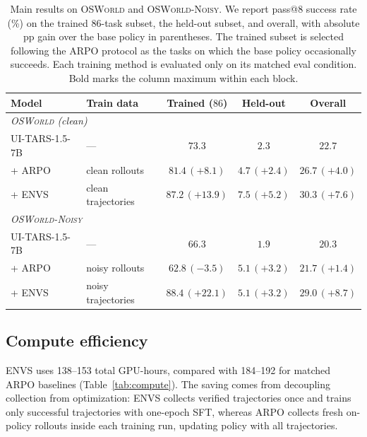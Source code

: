 \documentclass[11pt]{article}
\begin{document}
\begin{table}[H]
  \caption{Main results on \textsc{OSWorld} and \textsc{OSWorld-Noisy}. We
  report pass@8 success rate (\%) on the trained 86-task subset, the
  held-out subset, and overall, with absolute pp gain over the base
  policy in parentheses. The trained subset is selected following the
  ARPO protocol as the tasks on which the base policy occasionally
  succeeds. Each training method is evaluated only on its matched eval
  condition. Bold marks the column maximum within each block.}
  \label{tab:main-results}
  \centering
  \small
  \begin{tabular}{llccc}
    \toprule
    Model           & Train data         & Trained ($86$)            & Held-out                 & Overall                    \\
    \midrule
    \multicolumn{5}{l}{\textit{\textsc{OSWorld} (clean)}} \\
    UI-TARS-1.5-7B  & ---                & $73.3$                    & $2.3$                    & $22.7$                     \\
    + ARPO          & clean rollouts     & $81.4\,(+8.1)$            & $4.7\,(+2.4)$            & $26.7\,(+4.0)$             \\
    + ENVS          & clean trajectories & $\mathbf{87.2\,(+13.9)}$  & $\mathbf{7.5\,(+5.2)}$   & $\mathbf{30.3\,(+7.6)}$    \\
    \midrule
    \multicolumn{5}{l}{\textit{\textsc{OSWorld-Noisy}}} \\
    UI-TARS-1.5-7B  & ---                & $66.3$                    & $1.9$                    & $20.3$                     \\
    + ARPO          & noisy rollouts     & $62.8\,(-3.5)$            & $5.1\,(+3.2)$            & $21.7\,(+1.4)$             \\
    + ENVS          & noisy trajectories & $\mathbf{88.4\,(+22.1)}$  & $\mathbf{5.1\,(+3.2)}$   & $\mathbf{29.0\,(+8.7)}$    \\
    \bottomrule
  \end{tabular}
\end{table}


\subsection{Compute efficiency}
\label{sec:compute}

ENVS uses 138--153 total GPU-hours, compared with 184--192 for matched
ARPO baselines (Table~\ref{tab:compute}).
The saving comes from decoupling collection from optimization: ENVS
collects verified trajectories once and trains only successful trajectories with one-epoch SFT,
whereas ARPO collects fresh on-policy rollouts inside each training run, updating policy with all trajectories.
\end{document}
